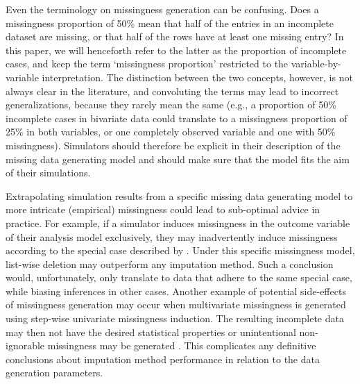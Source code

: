 \documentclass[bimj,fleqn]{w-art}
\begin{document}
Even the terminology on missingness generation can be confusing. Does a missingness proportion of 50\% mean that half of the entries in an incomplete dataset are missing, or that half of the rows have at least one missing entry? In this paper, we will henceforth refer to the latter as the proportion of incomplete cases, and keep the term `missingness proportion' restricted to the variable-by-variable interpretation. The distinction between the two concepts, however, is not always clear in the literature, and convoluting the terms may lead to incorrect generalizations, because they rarely mean the same (e.g., a proportion of 50\% incomplete cases in bivariate data could translate to a missingness proportion of 25\% in both variables, or one completely observed variable and one with 50\% missingness). Simulators should therefore be explicit in their description of the missing data generating model and should make sure that the model fits the aim of their simulations. 


Extrapolating simulation results from a specific missing data generating model to more intricate (empirical) missingness could lead to sub-optimal advice in practice. For example, if a simulator induces missingness in the outcome variable of their analysis model exclusively, they may inadvertently induce missingness according to the special case described by \citet[][\S 2.7]{buur18}. Under this specific missingness model, list-wise deletion may outperform any imputation method. Such a conclusion would, unfortunately, only translate to data that adhere to the same special case, while biasing inferences in other cases. %
Another example of potential side-effects of missingness generation may occur when multivariate missingness is generated using step-wise univariate missingness induction. The resulting incomplete data may then not have the desired statistical properties or unintentional non-ignorable missingness may be generated \citep{ampute, robins1997}. This complicates any definitive conclusions about imputation method performance in relation to the data generation parameters.
\end{document}
